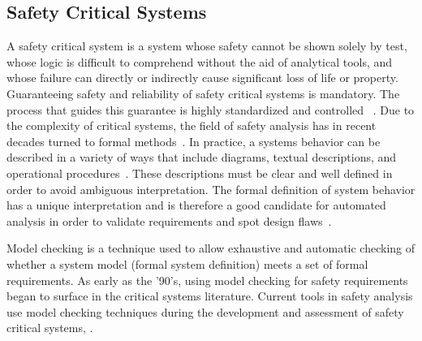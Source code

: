 \subsection{Safety Critical Systems}
\label{sec:SA_background}
A safety critical system is a system whose safety cannot be shown solely by test, whose logic is difficult to comprehend without the aid of analytical tools, and whose failure can directly or indirectly cause significant loss of life or property\cite{SAE:ARP4761}. Guaranteeing safety and reliability of safety critical systems is mandatory. The process that guides this guarantee is highly standardized and controlled~\cite{RTCA:StdC,SAE:ARP4761} . Due to the complexity of critical systems, the field of safety analysis has in recent decades turned to formal methods~\cite{MattareiThesis,Bozzano:2010:DSA:1951720}. In practice, a systems behavior can be described in a variety of ways that include diagrams, textual descriptions, and operational procedures~\cite{SAE:ARP4754A}. These descriptions must be clear and well defined in order to avoid ambiguous interpretation. The formal definition of system behavior has a unique interpretation and is therefore a good candidate for automated analysis in order to validate requirements and spot design flaws~\cite{Joshi05:Dasc}. 

Model checking is a technique used to allow exhaustive and automatic checking of whether a system model (formal system definition) meets a set of formal requirements. As early as the '90's, using model checking for safety requirements began to surface in the critical systems literature\cite{10.1007/3-540-61772-8_46,DBLP:conf/safecomp/CimattiGMRTT98,DBLP:conf/edcc/BernardeschiFGM96}. Current tools in safety analysis use model checking techniques during the development and assessment of safety critical systems, \cite{MattareiThesis,info17:HaLuHo,CAV2015:BoCiGrMa,symbAltaRica,DBLP:conf/tacas/BittnerBCCGGMMZ16}.






